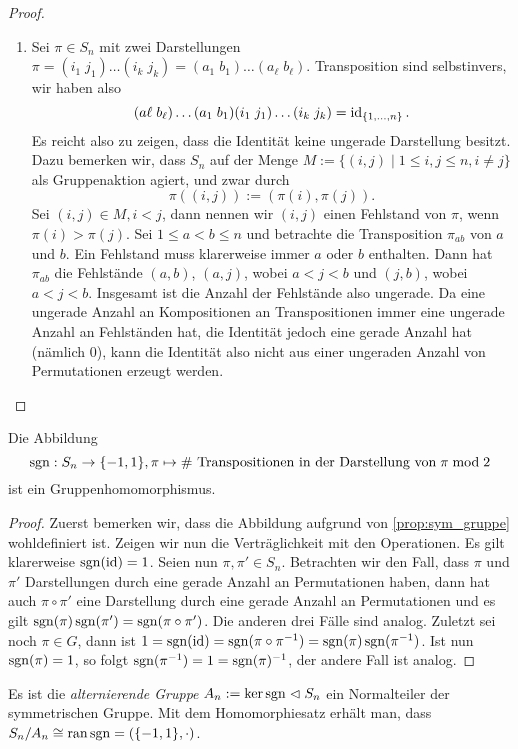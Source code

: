 \begin{proof}{\ }
\begin{enumerate}
        \item Sei $\pi \in S_n$ mit zwei Darstellungen $\pi = (i_1\; j_1) \hdots (i_k\; j_k) = (a_1\; b_1) \hdots (a_\ell\; b_\ell)$. Transposition sind selbstinvers, wir haben also
        $$ (a\ell\; b_\ell) \hdots (a_1\; b_1) (i_1\; j_1) \hdots (i_k\; j_k) = \operatorname{id}_{\{1,\hdots,n\}}. $$
        Es reicht also zu zeigen, dass die Identität keine ungerade Darstellung besitzt. Dazu bemerken wir, dass $S_n$ auf der Menge $M := \{ (i, j) \mid 1 \leq i, j \leq n, i \neq j \}$ als Gruppenaktion agiert, und zwar durch
        $$ \pi((i, j)) := (\pi(i), \pi(j)). $$
        Sei $(i, j) \in M, i < j$, dann nennen wir $(i,j)$ einen Fehlstand von $\pi$, wenn $\pi(i) > \pi(j)$. Sei $1 \leq a < b \leq n$ und betrachte die Transposition $\pi_{ab}$ von $a$ und $b$. Ein Fehlstand muss klarerweise immer $a$ oder $b$ enthalten. Dann hat $\pi_{ab}$ die Fehlstände $(a, b)$, $(a, j)$, wobei $a < j < b$ und $(j, b)$, wobei $a < j < b$. Insgesamt ist die Anzahl der Fehlstände also ungerade. Da eine ungerade Anzahl an Kompositionen an Transpositionen immer eine ungerade Anzahl an Fehlständen hat, die Identität jedoch eine gerade Anzahl hat (nämlich 0), kann die Identität also nicht aus einer ungeraden Anzahl von Permutationen erzeugt werden.
    \end{enumerate}
\end{proof}

\begin{corollary}
    Die Abbildung $$\operatorname{sgn}: S_n \to \{-1,1\}, \pi \mapsto \text{\# Transpositionen in der Darstellung von}\;\pi\;\text{mod}\; 2$$ ist ein Gruppenhomomorphismus.
\end{corollary}
\begin{proof}
    Zuerst bemerken wir, dass die Abbildung aufgrund von \cref{prop:sym_gruppe} wohldefiniert ist. Zeigen wir nun die Verträglichkeit mit den Operationen. Es gilt klarerweise $\operatorname{sgn}(\operatorname{id}) = 1$. Seien nun $\pi, \pi' \in S_n$. Betrachten wir den Fall, dass $\pi$ und $\pi'$ Darstellungen durch eine gerade Anzahl an Permutationen haben, dann hat auch $\pi \circ \pi'$ eine Darstellung durch eine gerade Anzahl an Permutationen und es gilt $\operatorname{sgn}(\pi)\operatorname{sgn}(\pi') = \operatorname{sgn}(\pi \circ \pi')$. Die anderen drei Fälle sind analog. Zuletzt sei noch $\pi \in G$, dann ist $1 = \operatorname{sgn}(\operatorname{id}) = \operatorname{sgn}(\pi \circ \pi^{-1}) = \operatorname{sgn}(\pi) \operatorname{sgn}(\pi^{-1})$. Ist nun $\operatorname{sgn}(\pi) = 1$, so folgt $\operatorname{sgn}(\pi^{-1}) = 1 = \operatorname{sgn}(\pi)^{-1}$, der andere Fall ist analog.
\end{proof}

\begin{remark}
    Es ist die \emph{alternierende Gruppe} $A_n := \ker \operatorname{sgn} \vartriangleleft S_n$ ein Normalteiler der symmetrischen Gruppe. Mit dem Homomorphiesatz erhält man, dass $S_n/A_n \cong \operatorname{ran} \operatorname{sgn} = (\{-1,1\}, \cdot)$.
\end{remark}

